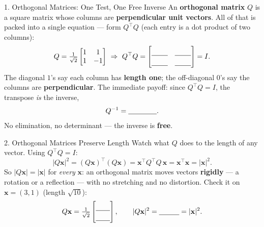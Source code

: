 \documentclass[10pt]{article}
\newcommand{\xx}{\mathbf{x}}
\newcommand{\T}{^{\top}}
\begin{document}
\begin{notesbox}{1. Orthogonal Matrices: One Test, One Free Inverse}
An \textbf{orthogonal matrix} $Q$ is a square matrix whose columns are \textbf{perpendicular unit vectors}. All
of that is packed into a single equation --- form $Q\T Q$ (each entry is a dot product of two columns):
\[
  Q=\tfrac1{\sqrt2}\begin{bmatrix} 1 & 1\\ 1 & -1 \end{bmatrix}\ \Rightarrow\
  Q\T Q=\begin{bmatrix}\rule{0pt}{1.1em}\blank{0.8cm} & \blank{0.8cm}\\[2pt]\blank{0.8cm} & \blank{0.8cm}\end{bmatrix}=I.
\]
The diagonal $1$'s say each column has \textbf{length one}; the off-diagonal $0$'s say the columns are
\textbf{perpendicular}. The immediate payoff: since $Q\T Q=I$, the transpose \emph{is} the inverse,
\[
  Q^{-1}=\blank{1.4cm}.
\]
No elimination, no determinant --- the inverse is \textbf{free}.
\end{notesbox}

\begin{notesbox}{2. Orthogonal Matrices Preserve Length}
Watch what $Q$ does to the length of any vector. Using $Q\T Q=I$:
\[
  |Q\xx|^2=(Q\xx)\T(Q\xx)=\xx\T Q\T Q\,\xx=\xx\T\xx=|\xx|^2.
\]
So $|Q\xx|=|\xx|$ for \emph{every} $\xx$: an orthogonal matrix moves vectors \textbf{rigidly} --- a rotation or a
reflection --- with no stretching and no distortion. Check it on $\xx=(3,1)$ (length $\sqrt{10}$):
\[
  Q\xx=\tfrac1{\sqrt2}\begin{bmatrix}\rule{0pt}{1.1em}\blank{0.7cm}\\[2pt]\blank{0.7cm}\end{bmatrix},\qquad
  |Q\xx|^2=\blank{1.0cm}=|\xx|^2.
\]
\end{notesbox}
\end{document}
